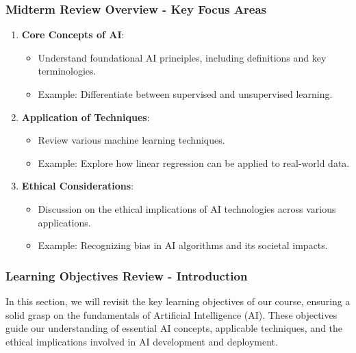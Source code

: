 \documentclass[aspectratio=169]{beamer}
\begin{document}
\begin{frame}[fragile]
    \frametitle{Midterm Review Overview - Key Focus Areas}
    \begin{enumerate}
        \item \textbf{Core Concepts of AI}:
        \begin{itemize}
            \item Understand foundational AI principles, including definitions and key terminologies.
            \item Example: Differentiate between supervised and unsupervised learning.
        \end{itemize}
        
        \item \textbf{Application of Techniques}:
        \begin{itemize}
            \item Review various machine learning techniques.
            \item Example: Explore how linear regression can be applied to real-world data.
        \end{itemize}
        
        \item \textbf{Ethical Considerations}:
        \begin{itemize}
            \item Discussion on the ethical implications of AI technologies across various applications.
            \item Example: Recognizing bias in AI algorithms and its societal impacts.
        \end{itemize}
    \end{enumerate}
\end{frame}

\begin{frame}[fragile]
    \frametitle{Learning Objectives Review - Introduction}
    In this section, we will revisit the key learning objectives of our course, ensuring a solid grasp on the fundamentals of Artificial Intelligence (AI). These objectives guide our understanding of essential AI concepts, applicable techniques, and the ethical implications involved in AI development and deployment.
\end{frame}
\end{document}
